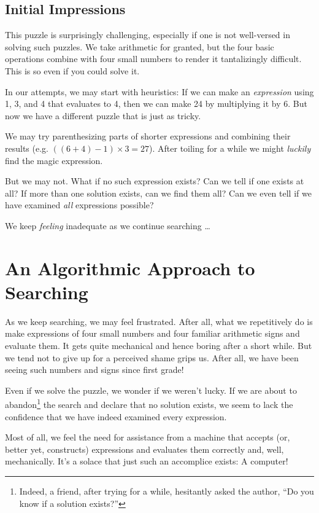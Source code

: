 \documentclass[english,smartquotes]{hgbarticle}
\begin{document}
\subsection{Initial Impressions}
This puzzle is surprisingly challenging, especially if one is not well-versed in solving such puzzles. We take arithmetic for granted, but the four basic operations combine with four small numbers to render it tantalizingly difficult. This is so even if you could solve it.

In our attempts, we may start with heuristics: If we can make an \textit{expression} using 1, 3, and 4 that evaluates to 4, then we can make 24 by multiplying it by 6. But now we have a different puzzle that is just as tricky.

We may try parenthesizing parts of shorter expressions and combining their results (e.g. $((6+4)-1)\times3 = 27$). After toiling for a while we might \textit{luckily} find the magic expression.

But we may not. What if no such expression exists? Can we tell if one exists at all? If more than one solution exists, can we find them all? Can we even tell if we have examined \textit{all} expressions possible?

We keep \textit{feeling} inadequate as we continue searching \dots
\section{An Algorithmic Approach to Searching}
As we keep searching, we may feel frustrated. After all, what we repetitively do is make expressions of four small numbers and four familiar arithmetic signs and evaluate them. It gets quite mechanical and hence boring after a short while. But we tend not to give up for a perceived shame grips us. After all, we have been seeing such numbers and signs since first grade!

Even if we solve the puzzle, we wonder if we weren't lucky. If we are about to abandon\footnote{Indeed, a friend, after trying for a while, hesitantly asked the author, ``Do you know if a solution exists?''} the search and declare that no solution exists, we seem to lack the confidence that we have indeed examined every expression. 

Most of all, we feel the need for assistance from a machine that accepts (or, better yet, constructs) expressions and evaluates them correctly and, well, mechanically. It's a solace that just such an accomplice exists: A computer! 
\end{document}
